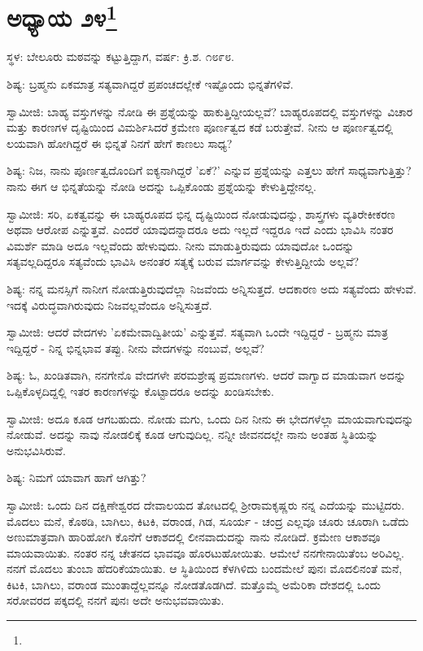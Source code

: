 \chapter[ಅಧ್ಯಾಯ ೨೪]{ಅಧ್ಯಾಯ ೨೪\protect\footnote{}}

\begin{center}
ಸ್ಥಳ: ಬೇಲೂರು ಮಠವನ್ನು ಕಟ್ಟುತ್ತಿದ್ದಾಗ, ವರ್ಷ: ಕ್ರಿ.ಶ. ೧೮೯೮.
\end{center}

ಶಿಷ್ಯ: ಬ್ರಹ್ಮನು ಏಕಮಾತ್ರ ಸತ್ಯವಾಗಿದ್ದರೆ ಪ್ರಪಂಚದಲ್ಲೇಕೆ ಇಷ್ಟೊಂದು ಭಿನ್ನತೆಗಳಿವೆ.

ಸ್ವಾಮೀಜಿ: ಬಾಹ್ಯ ವಸ್ತುಗಳನ್ನು ನೋಡಿ ಈ ಪ್ರಶ್ನೆಯನ್ನು ಹಾಕುತ್ತಿದ್ದೀಯಲ್ಲವೆ? ಬಾಹ್ಯರೂಪದಲ್ಲಿ ವಸ್ತುಗಳನ್ನು ವಿಚಾರ ಮತ್ತು ಕಾರಣಗಳ ದೃಷ್ಟಿಯಿಂದ ವಿಮರ್ಶಿಸಿದರೆ ಕ್ರಮೇಣ ಪೂರ್ಣತ್ವದ ಕಡೆ ಬರುತ್ತೇವೆ. ನೀನು ಆ ಪೂರ್ಣತ್ವದಲ್ಲಿ ಲಯವಾಗಿ ಹೋಗಿದ್ದರೆ ಈ ಭಿನ್ನತೆ ನಿನಗೆ ಹೇಗೆ ಕಾಣಲು ಸಾಧ್ಯ?

ಶಿಷ್ಯ: ನಿಜ, ನಾನು ಪೂರ್ಣತ್ವದೊಂದಿಗೆ ಐಕ್ಯನಾಗಿದ್ದರೆ 'ಏಕೆ?' ಎನ್ನುವ ಪ್ರಶ್ನೆಯನ್ನು ಎತ್ತಲು ಹೇಗೆ ಸಾಧ್ಯವಾಗುತ್ತಿತ್ತು? ನಾನು ಈಗ ಆ ಭಿನ್ನತೆಯನ್ನು ನೋಡಿ ಅದನ್ನು ಒಪ್ಪಿಕೊಂಡು ಪ್ರಶ್ನೆಯನ್ನು ಕೇಳುತ್ತಿದ್ದೇನಲ್ಲ.

ಸ್ವಾಮೀಜಿ: ಸರಿ, ಏಕತ್ವವನ್ನು ಈ ಬಾಹ್ಯರೂಪದ ಭಿನ್ನ ದೃಷ್ಟಿಯಿಂದ ನೋಡುವುದನ್ನು, ಶಾಸ್ತ್ರಗಳು ವ್ಯತಿರೇಕೀಕರಣ ಅಥವಾ ಆರೋಪ ಎನ್ನುತ್ತವೆ. ಎಂದರೆ ಯಾವುದನ್ನಾದರೂ ಅದು ಇಲ್ಲದೆ ಇದ್ದರೂ ಇದೆ ಎಂದು ಭಾವಿಸಿ ನಂತರ ವಿಮರ್ಶೆ ಮಾಡಿ ಅದೂ ಇಲ್ಲವೆಂದು ಹೇಳುವುದು. ನೀನು ಮಾಡುತ್ತಿರುವುದು ಯಾವುದೋ ಒಂದನ್ನು ಸತ್ಯವಲ್ಲದಿದ್ದರೂ ಸತ್ಯವೆಂದು ಭಾವಿಸಿ ಅನಂತರ ಸತ್ಯಕ್ಕೆ ಬರುವ ಮಾರ್ಗವನ್ನು ಕೇಳುತ್ತಿದ್ದೀಯೆ ಅಲ್ಲವೆ?

ಶಿಷ್ಯ: ನನ್ನ ಮನಸ್ಸಿಗೆ ನಾನೀಗ ನೋಡುತ್ತಿರುವುದೆಲ್ಲಾ ನಿಜವೆಂದು ಅನ್ನಿಸುತ್ತದೆ. ಆದಕಾರಣ ಅದು ಸತ್ಯವೆಂದು ಹೇಳುವೆ. ಇದಕ್ಕೆ ವಿರುದ್ಧವಾಗಿರುವುದು ನಿಜವಲ್ಲವೆಂದೂ ಅನ್ನಿಸುತ್ತದೆ.

ಸ್ವಾಮೀಜಿ: ಆದರೆ ವೇದಗಳು 'ಏಕಮೇವಾದ್ವಿತೀಯ' ಎನ್ನುತ್ತವೆ. ಸತ್ಯವಾಗಿ ಒಂದೇ ಇದ್ದಿದ್ದರೆ - ಬ್ರಹ್ಮನು ಮಾತ್ರ ಇದ್ದಿದ್ದರೆ - ನಿನ್ನ ಭಿನ್ನಭಾವ ತಪ್ಪು. ನೀನು ವೇದಗಳನ್ನು ನಂಬುವೆ, ಅಲ್ಲವೆ?

ಶಿಷ್ಯ: ಓ, ಖಂಡಿತವಾಗಿ, ನನಗೇನೊ ವೇದಗಳೇ ಪರಮಶ್ರೇಷ್ಠ ಪ್ರಮಾಣಗಳು. ಆದರೆ ವಾಗ್ವಾದ ಮಾಡುವಾಗ ಅದನ್ನು ಒಪ್ಪಿಕೊಳ್ಳದಿದ್ದಲ್ಲಿ ಇತರ ಕಾರಣಗಳನ್ನು ಕೊಟ್ಟಾದರೂ ಅದನ್ನು ಖಂಡಿಸಬೇಕು.

ಸ್ವಾಮೀಜಿ: ಅದೂ ಕೂಡ ಆಗಬಹುದು. ನೋಡು ಮಗು, ಒಂದು ದಿನ ನೀನು ಈ ಭೇದಗಳೆಲ್ಲಾ ಮಾಯವಾಗುವುದನ್ನು ನೋಡುವೆ. ಅದನ್ನು ನಾವು ನೋಡಲಿಕ್ಕೆ ಕೂಡ ಆಗುವುದಿಲ್ಲ. ನನ್ನೀ ಜೀವನದಲ್ಲೇ ನಾನು ಅಂತಹ ಸ್ಥಿತಿಯನ್ನು ಅನುಭವಿಸಿರುವೆ.

ಶಿಷ್ಯ: ನಿಮಗೆ ಯಾವಾಗ ಹಾಗೆ ಆಗಿತ್ತು?

ಸ್ವಾಮೀಜಿ: ಒಂದು ದಿನ ದಕ್ಷಿಣೇಶ್ವರದ ದೇವಾಲಯದ ತೋಟದಲ್ಲಿ ಶ‍್ರೀರಾಮಕೃಷ್ಣರು ನನ್ನ ಎದೆಯನ್ನು ಮುಟ್ಟಿದರು. ಮೊದಲು ಮನೆ, ಕೊಠಡಿ, ಬಾಗಿಲು, ಕಿಟಕಿ, ವರಾಂಡ, ಗಿಡ, ಸೂರ್ಯ - ಚಂದ್ರ ಎಲ್ಲವೂ ಚೂರು ಚೂರಾಗಿ ಒಡೆದು ಅಣುಮಾತ್ರವಾಗಿ ಹಾರಿಹೋಗಿ ಕೊನೆಗೆ ಆಕಾಶದಲ್ಲಿ ಲೀನವಾದುದನ್ನು ನಾನು ನೋಡಿದೆ. ಕ್ರಮೇಣ ಆಕಾಶವೂ ಮಾಯವಾಯಿತು. ನಂತರ ನನ್ನ ಚೇತನದ ಭಾವವೂ ಹೊರಟುಹೋಯಿತು. ಆಮೇಲೆ ನನಗೇನಾಯಿತೆಂಬ ಅರಿವಿಲ್ಲ. ನನಗೆ ಮೊದಲು ತುಂಬಾ ಹೆದರಿಕೆಯಾಯಿತು. ಆ ಸ್ಥಿತಿಯಿಂದ ಕೆಳಗಿಳಿದು ಬಂದಮೇಲೆ ಪುನಃ ಮೊದಲಿನಂತೆ ಮನೆ, ಕಿಟಕಿ, ಬಾಗಿಲು, ವರಾಂಡ ಮುಂತಾದ್ದೆಲ್ಲವನ್ನೂ ನೋಡತೊಡಗಿದೆ. ಮತ್ತೊಮ್ಮೆ ಅಮೆರಿಕಾ ದೇಶದಲ್ಲಿ ಒಂದು ಸರೋವರದ ಪಕ್ಕದಲ್ಲಿ ನನಗೆ ಪುನಃ ಅದೇ ಅನುಭವವಾಯಿತು.

